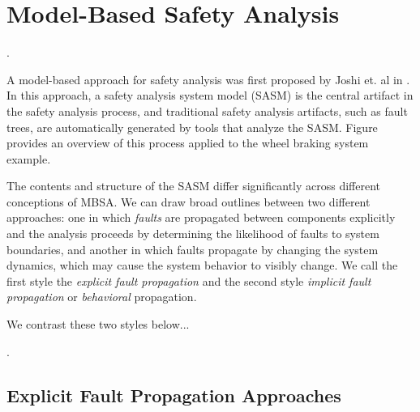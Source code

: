 \section{Model-Based Safety Analysis}

.

A model-based approach for safety analysis was first proposed by Joshi et. al in \cite{Joshi05:Dasc, Joshi05:SafeComp, Joshi07:Hase}.  In this approach, a safety analysis system model (SASM) is the central artifact in the safety analysis process, and traditional safety analysis artifacts, such as fault trees, are automatically generated by tools that analyze the SASM. Figure~  provides an overview of this process applied to the wheel braking system example.

The contents and structure of the SASM differ significantly across different conceptions of MBSA.  We can draw broad outlines between two different approaches: one in which {\em faults} are propagated between components explicitly and the analysis proceeds by determining the likelihood of faults to system boundaries, and another in which faults propagate by changing the system dynamics, which may cause the system behavior to visibly change.  We call the first style the {\em explicit fault propagation} and the second style {\em implicit fault propagation} or {\em behavioral} propagation.

We contrast these two styles below...

 \cite{info17:HaLuHo}.





\subsection{Explicit Fault Propagation Approaches}



